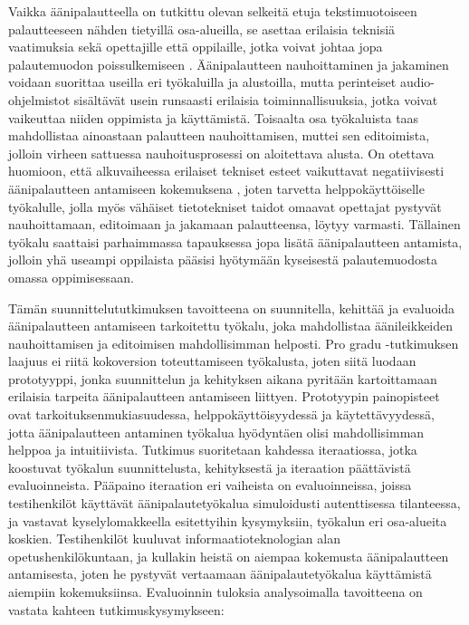 \documentclass[utf8]{gradu3}
\begin{document}
Vaikka äänipalautteella on tutkittu olevan selkeitä etuja tekstimuotoiseen palautteeseen nähden tietyillä osa-alueilla, se asettaa erilaisia teknisiä vaatimuksia sekä opettajille että oppilaille, jotka voivat johtaa jopa palautemuodon poissulkemiseen \parencite[][]{developing}. Äänipalautteen nauhoittaminen ja jakaminen voidaan suorittaa useilla eri työkaluilla ja alustoilla, mutta perinteiset audio-ohjelmistot sisältävät usein runsaasti erilaisia toiminnallisuuksia, jotka voivat vaikeuttaa niiden oppimista ja käyttämistä. Toisaalta osa työkaluista taas mahdollistaa ainoastaan palautteen nauhoittamisen, muttei sen editoimista, jolloin virheen sattuessa nauhoitusprosessi on aloitettava alusta. On otettava huomioon, että alkuvaiheessa erilaiset tekniset esteet vaikuttavat negatiivisesti äänipalautteen antamiseen kokemuksena \parencite[][]{versus}, joten tarvetta helppokäyttöiselle työkalulle, jolla myös vähäiset tietotekniset taidot omaavat opettajat pystyvät nauhoittamaan, editoimaan ja jakamaan palautteensa, löytyy varmasti. Tällainen työkalu saattaisi parhaimmassa tapauksessa jopa  lisätä äänipalautteen antamista, jolloin yhä useampi oppilaista pääsisi hyötymään kyseisestä palautemuodosta omassa oppimisessaan.

Tämän suunnittelututkimuksen tavoitteena on suunnitella, kehittää ja evaluoida äänipalautteen antamiseen tarkoitettu työkalu, joka mahdollistaa äänileikkeiden nauhoittamisen ja editoimisen mahdollisimman helposti. Pro gradu -tutkimuksen laajuus ei riitä kokoversion toteuttamiseen työkalusta, joten siitä luodaan prototyyppi, jonka suunnittelun ja kehityksen aikana pyritään kartoittamaan erilaisia tarpeita äänipalautteen antamiseen liittyen. Prototyypin painopisteet ovat tarkoituksenmukiasuudessa, helppokäyttöisyydessä ja käytettävyydessä, jotta äänipalautteen antaminen työkalua hyödyntäen olisi mahdollisimman helppoa ja intuitiivista. Tutkimus suoritetaan kahdessa iteraatiossa, jotka koostuvat työkalun suunnittelusta, kehityksestä ja iteraation päättävistä evaluoinneista.  Pääpaino iteraation eri vaiheista on evaluoinneissa, joissa testihenkilöt käyttävät äänipalautetyökalua simuloidusti autenttisessa tilanteessa, ja vastavat kyselylomakkeella esitettyihin kysymyksiin, työkalun eri osa-alueita koskien. Testihenkilöt kuuluvat informaatioteknologian alan opetushenkilökuntaan, ja kullakin heistä on aiempaa kokemusta äänipalautteen antamisesta, joten he pystyvät vertaamaan äänipalautetyökalua käyttämistä aiempiin kokemuksiinsa. Evaluoinnin tuloksia analysoimalla tavoitteena on vastata kahteen tutkimuskysymykseen:
\end{document}
